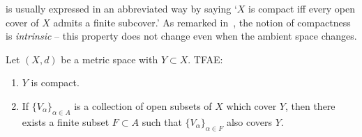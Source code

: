  is usually expressed in an abbreviated way by saying `$X$ is compact iff every open cover of $X$ admits a finite subcover.' As remarked in~, the notion of compactness is \textit{intrinsic} -- this property does not change even when the ambient space changes.
\begin{lemma}
\label{lem:cpct_int}
Let $(X,d)$ be a metric space with $Y\subset X$. TFAE:
\begin{enumerate}
	\item \label{cpct_int_1} $Y$ is compact.
	\item \label{cpct_int_2} If $\{V_\alpha\}_{\alpha \in A}$ is a collection of open subsets of $X$ which cover $Y$, then there exists a finite subset $F\subset A$ such that $\{V_\alpha\}_{\alpha \in F}$ also covers $Y$.
\end{enumerate}
\end{lemma}
